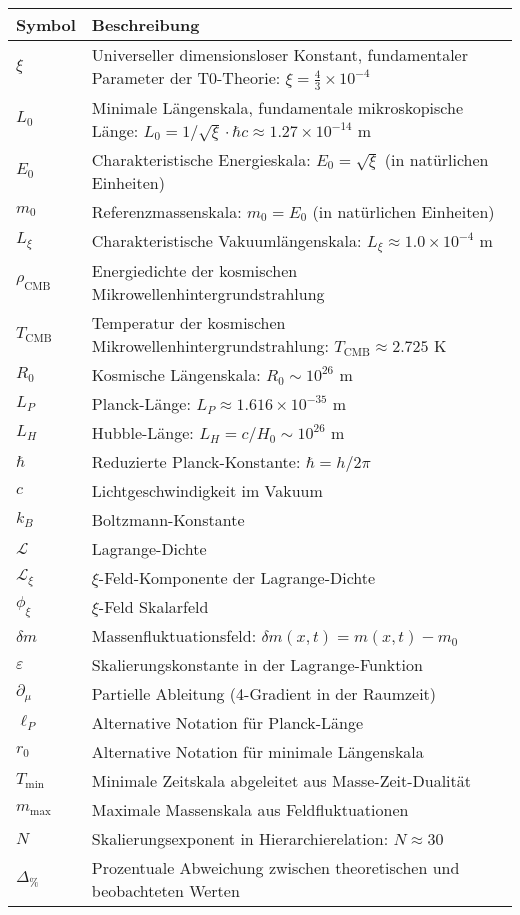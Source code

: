 \documentclass[12pt,a4paper]{article}
\numberwithin{equation}{section}
\begin{document}
	\begin{longtable}{p{2cm} p{12cm}}
		\toprule
		\textbf{Symbol} & \textbf{Beschreibung} \\
		\midrule
		\endhead
		
		$\xi$ & Universeller dimensionsloser Konstant, fundamentaler Parameter der T0-Theorie: $\xi = \frac{4}{3} \times 10^{-4}$ \\
		$L_0$ & Minimale Längenskala, fundamentale mikroskopische Länge: $L_0 = 1/\sqrt{\xi} \cdot \hbar c \approx 1.27 \times 10^{-14}$ m \\
		$E_0$ & Charakteristische Energieskala: $E_0 = \sqrt{\xi}$ (in natürlichen Einheiten) \\
		$m_0$ & Referenzmassenskala: $m_0 = E_0$ (in natürlichen Einheiten) \\
		$L_\xi$ & Charakteristische Vakuumlängenskala: $L_\xi \approx 1.0 \times 10^{-4}$ m \\
		$\rho_{\text{CMB}}$ & Energiedichte der kosmischen Mikrowellenhintergrundstrahlung \\
		$T_{\text{CMB}}$ & Temperatur der kosmischen Mikrowellenhintergrundstrahlung: $T_{\text{CMB}} \approx 2.725$ K \\
		$R_0$ & Kosmische Längenskala: $R_0 \sim 10^{26}$ m \\
		$L_P$ & Planck-Länge: $L_P \approx 1.616 \times 10^{-35}$ m \\
		$L_H$ & Hubble-Länge: $L_H = c/H_0 \sim 10^{26}$ m \\
		$\hbar$ & Reduzierte Planck-Konstante: $\hbar = h/2\pi$ \\
		$c$ & Lichtgeschwindigkeit im Vakuum \\
		$k_B$ & Boltzmann-Konstante \\
		$\mathcal{L}$ & Lagrange-Dichte \\
		$\mathcal{L}_{\xi}$ & $\xi$-Feld-Komponente der Lagrange-Dichte \\
		$\phi_\xi$ & $\xi$-Feld Skalarfeld \\
		$\delta m$ & Massenfluktuationsfeld: $\delta m(x,t) = m(x,t) - m_0$ \\
		$\varepsilon$ & Skalierungskonstante in der Lagrange-Funktion \\
		$\partial_\mu$ & Partielle Ableitung (4-Gradient in der Raumzeit) \\
		$\ell_P$ & Alternative Notation für Planck-Länge \\
		$r_0$ & Alternative Notation für minimale Längenskala \\
		$T_{\text{min}}$ & Minimale Zeitskala abgeleitet aus Masse-Zeit-Dualität \\
		$m_{\text{max}}$ & Maximale Massenskala aus Feldfluktuationen \\
		$N$ & Skalierungsexponent in Hierarchierelation: $N \approx 30$ \\
		$\Delta_{\%}$ & Prozentuale Abweichung zwischen theoretischen und beobachteten Werten \\
		\bottomrule
	\end{longtable}
	
\end{document}
